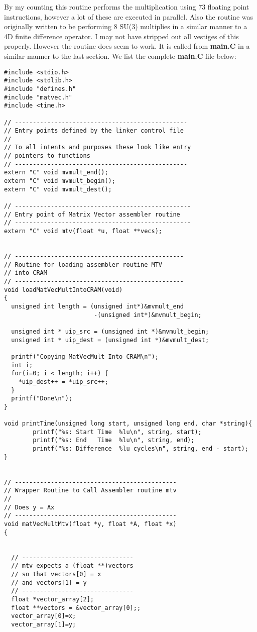 By my counting this routine performs the multiplication using 73 floating
point instructions, however a lot of these are executed in parallel. Also
the routine was originally written to be performing 8 SU(3) multiplies
in a similar manner to a 4D finite difference operator. I may not have
stripped out all vestiges of this properly. However the routine does
seem to work. It is called from {\bf main.C} in a similar manner to the 
last section. We list the complete {\bf main.C} file below:
{\scriptsize
\begin{verbatim}
#include <stdio.h>
#include <stdlib.h>
#include "defines.h"
#include "matvec.h"
#include <time.h>

// ------------------------------------------------
// Entry points defined by the linker control file
//
// To all intents and purposes these look like entry
// pointers to functions
// ------------------------------------------------
extern "C" void mvmult_end();
extern "C" void mvmult_begin();
extern "C" void mvmult_dest();

// -------------------------------------------------
// Entry point of Matrix Vector assembler routine
// -------------------------------------------------
extern "C" void mtv(float *u, float **vecs);


// -----------------------------------------------
// Routine for loading assembler routine MTV
// into CRAM
// -----------------------------------------------
void loadMatVecMultIntoCRAM(void)
{
  unsigned int length = (unsigned int*)&mvmult_end
                         -(unsigned int*)&mvmult_begin;

  unsigned int * uip_src = (unsigned int *)&mvmult_begin;
  unsigned int * uip_dest = (unsigned int *)&mvmult_dest;

  printf("Copying MatVecMult Into CRAM\n");
  int i;
  for(i=0; i < length; i++) {
    *uip_dest++ = *uip_src++;
  }
  printf("Done\n");
}

void printTime(unsigned long start, unsigned long end, char *string){
        printf("%s: Start Time  %lu\n", string, start);
        printf("%s: End   Time  %lu\n", string, end);
        printf("%s: Difference  %lu cycles\n", string, end - start);
} 


// ---------------------------------------------
// Wrapper Routine to Call Assembler routine mtv
// 
// Does y = Ax
// ---------------------------------------------
void matVecMultMtv(float *y, float *A, float *x)
{


  // -------------------------------
  // mtv expects a (float **)vectors
  // so that vectors[0] = x
  // and vectors[1] = y
  // -------------------------------
  float *vector_array[2];
  float **vectors = &vector_array[0];;
  vector_array[0]=x;
  vector_array[1]=y;


\end{verbatim}}
